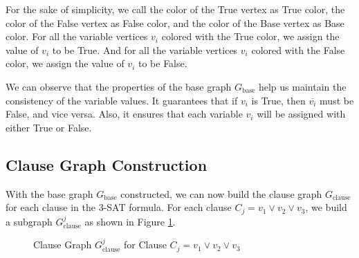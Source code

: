 \documentclass[a4paper,12pt]{article}
\begin{document}
For the sake of simplicity, we call the color of the True vertex as True color, the color of the False vertex as False color, and the color of the Base vertex as Base color.
For all the variable vertices $v_i$ colored with the True color, we assign the value of $v_i$ to be True.
And for all the variable vertices $v_i$ colored with the False color, we assign the value of $v_i$ to be False.

We can observe that the properties of the base graph $G_{\text{base}}$ help us maintain the consistency of the variable values.
It guarantees that if $v_i$ is True, then $\overline{v_i}$ must be False, and vice versa.
Also, it ensures that each variable $v_i$ will be assigned with either True or False.

\subsection{Clause Graph Construction}

With the base graph $G_{\text{base}}$ constructed, we can now build the clause graph $G_{\text{clause}}$ for each clause in the 3-SAT formula.
For each clause $C_j = v_1 \vee v_2 \vee v_3$, we build a subgraph $G_{\text{clause}}^j$ as shown in Figure \ref{fig:clause}.

\begin{figure}[H]
	\centering
	\caption{Clause Graph $G_{\text{clause}}^j$ for Clause $C_j = v_1 \vee v_2 \vee v_3$}
	\label{fig:clause}
\end{figure}
\end{document}
